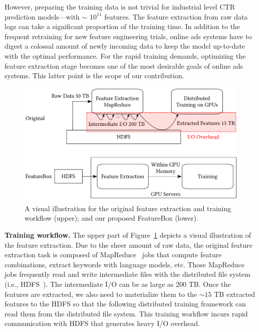 \documentclass[sigconf]{acmart}
\begin{document}
However, preparing the training data is not trivial for industrial level CTR prediction models---with $\sim$ $10^{11}$ features. The feature extraction from raw data logs can take a significant proportion of the training time. In addition to the frequent retraining for new feature engineering trials, online ads systems have to digest a colossal amount of newly incoming data to keep the model up-to-date with the optimal performance. For the rapid training demands, optimizing the feature extraction stage becomes one of the most desirable goals of online ads systems.
This latter point is the scope of our contribution.




\begin{figure}[htbp]
\includegraphics[width=.5\textwidth]{figs/feabox.pdf}

\caption{A visual illustration for the original feature extraction and training workflow (upper); and our proposed FeatureBox (lower).}\label{fig:feabox}%
\end{figure}

\textbf{Training workflow.} 
The upper part of Figure~\ref{fig:feabox} depicts a visual illustration of the feature extraction. Due to the sheer amount of raw data, the original feature extraction task is composed of MapReduce~\cite{dean2008mapreduce} jobs that compute feature combinations, extract keywords with language models, etc. 
Those MapReduce jobs frequently read and write intermediate files with the distributed file system (i.e., HDFS~\cite{borthakur2008hdfs}). The intermediate I/O can be as large as 200 TB. Once the features are extracted, we also need to materialize them to the $\sim 15$ TB extracted features to the HDFS so that the following distributed training framework can read them from the distributed file system. 
This training workflow incurs rapid communication with HDFS that generates heavy I/O overhead. 
\end{document}
